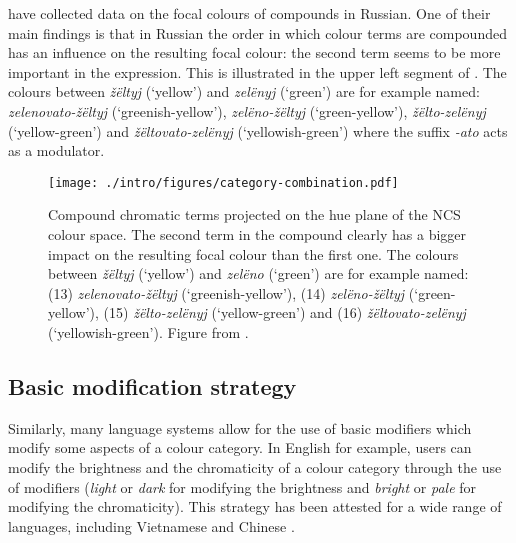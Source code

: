 \cite{safuanova07russian} have collected data on the focal colours of
compounds in Russian. One of their main findings is that in Russian
the order in which colour terms are compounded has an influence on
the resulting focal colour: the second term seems to be more important
in the expression. This is illustrated in the upper left segment of
. The colours between \textit{\v
z\"eltyj} (`yellow') and \textit{zel\"enyj} (`green') are for example named:
\textit{zelenovato-\v z\"eltyj} (`greenish-yellow'), \textit{zel\"eno-\v z\"eltyj}
(`green-yellow'), \textit{\v z\"elto-zel\"enyj} (`yellow-green') and \linebreak\textit{\v
z\"eltovato-zel\"enyj} (`yellowish-green') where the suffix \textit{-ato}
acts as a modulator.

\begin{figure}[htbp]
  \begin{center}
   \texttt{[image: ./intro/figures/category-combination.pdf]}
   \caption[Compound chromatic terms in Russian]{Compound chromatic
     terms projected on the hue plane of the NCS colour space. The
     second term in the compound clearly has a bigger impact on the
     resulting focal colour than the first one. The colours between
     \textit{\v z\"eltyj} (`yellow') and \textit{zel\"eno} (`green') are for example
     named: (13) \textit{zelenovato-\v z\"eltyj} (`greenish-yellow'), (14)
     \textit{zel\"eno-\v z\"eltyj} (`green-yellow'), (15) \textit{\v
     z\"elto-zel\"enyj} (`yellow-green') and (16) \textit{\v
     z\"eltovato-zel\"enyj} (`yellowish-green'). Figure from
     \cite{safuanova07russian}.}
    \label{f:category-combination}
  \end{center}
\end{figure}

\subsection{Basic modification strategy}

Similarly, many language systems allow for the use of basic
modifiers which modify some aspects of a colour category. In English
for example, users can modify the brightness and the chromaticity of a
colour category through the use of modifiers (\textit{light} or \textit{dark}
for modifying the brightness and \textit{bright} or \textit{pale} for modifying
the chromaticity). This strategy has been attested for a wide range of
languages, including Vietnamese \citep{alvarado02modifying} and
Chinese \citep{lin01unconstrained}.

